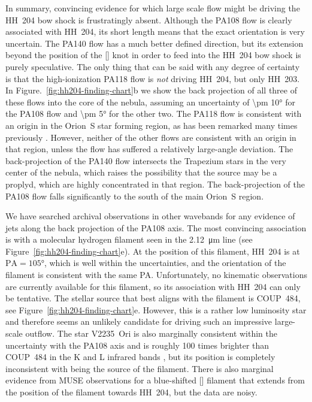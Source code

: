 \documentclass[twocolumn]{aastex63}
\begin{document}
In summary, convincing evidence for which large scale flow might be driving the
HH~204 bow shock is frustratingly absent.
Although the PA108 flow is clearly associated with HH~204, its short length means
that the exact orientation is very uncertain.
The PA140 flow has a much better defined direction,
but its extension beyond the position of the [] knot
in order to feed into the HH~204 bow shock is purely speculative.
The only thing that can be said with any degree of certainty is that the
high-ionization PA118 flow is \emph{not} driving HH~204, but only HH~203.
In Figure.~\ref{fig:hh204-finding-chart}b we show the back projection of
all three of these flows into the core of the nebula,
assuming an uncertainty of \ang{\pm 10} for the PA108 flow
and \ang{\pm 5} for the other two.
The PA118 flow is consistent with an origin in the Orion~S
star forming region,
as has been remarked many times previously
\citep{ODell:1997a, Rosado:2002e, ODell:2003n}.
However, neither of the other flows are consistent with an origin in that region,
unless the flow has suffered a relatively large-angle deviation.
The back-projection of the PA140 flow intersects the Trapezium stars
in the very center of the nebula, which raises the possibility that the source
may be a proplyd, which are highly concentrated in that region.
The back-projection of the PA108 flow falls significantly to the south
of the main Orion~S region.

We have searched archival observations in other wavebands
for any evidence of jets along the back projection of the PA108 axis.
The most convincing association is with a molecular hydrogen filament
seen in the \SI{2.12}{\micro m} line (see Figure~\ref{fig:hh204-finding-chart}e).
At the position of this filament, HH~204 is at \(\mathrm{PA} = \ang{105}\),
which is well within the uncertainties,
and the orientation of the filament is consistent with the same PA.\@
Unfortunately, no kinematic observations are currently available for this filament,
so its association with HH~204 can only be tentative.
The stellar source that best aligns with the  filament
is COUP~484, see Figure~\ref{fig:hh204-finding-chart}e.
However, this is a rather low luminosity star and therefore seems
an unlikely candidate for driving such an impressive large-scale outflow.
The star V2235~Ori is also marginally consistent within the uncertainty
with the PA108 axis and is roughly 100 times brighter than COUP~484
in the K and L infrared bands \citep{Muench:2002a},
but its position is completely inconsistent with being the source of the  filament.
There is also marginal evidence from MUSE observations \citep{Weilbacher:2015a}
for a blue-shifted [] filament that extends
from the position of the  filament towards HH~204, but the data are noisy. 



\end{document}
